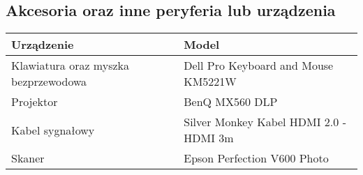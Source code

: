 \pagebreak

\subsection{Akcesoria oraz inne peryferia lub urządzenia}

    \begin{flushleft}
        \begin{table}[h]
            \renewcommand{\arraystretch}{1.5}
            \begin{tabular}{|l|l|}
            \hline
            \textbf{Urządzenie} & \textbf{Model} \\
            \hline
                Klawiatura oraz myszka bezprzewodowa & Dell Pro Keyboard and Mouse KM5221W \\
                Projektor & BenQ MX560 DLP \\
                Kabel sygnałowy & Silver Monkey Kabel HDMI 2.0 - HDMI 3m\\
                Skaner & Epson Perfection V600 Photo \\


            \hline
            \end{tabular}
        \end{table}

    \end{flushleft}    